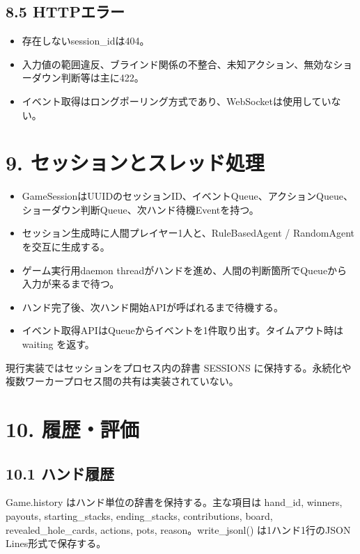 \documentclass[
]{article}
\begin{document}
\subsection{8.5 HTTPエラー}\label{httpux30a8ux30e9ux30fc}

\begin{itemize}
\item
  存在しないsession\_idは404。
\item
  入力値の範囲違反、ブラインド関係の不整合、未知アクション、無効なショーダウン判断等は主に422。
\item
  イベント取得はロングポーリング方式であり、WebSocketは使用していない。
\end{itemize}

\section{9.
セッションとスレッド処理}\label{ux30bbux30c3ux30b7ux30e7ux30f3ux3068ux30b9ux30ecux30c3ux30c9ux51e6ux7406}

\begin{itemize}
\item
  GameSessionはUUIDのセッションID、イベントQueue、アクションQueue、ショーダウン判断Queue、次ハンド待機Eventを持つ。
\item
  セッション生成時に人間プレイヤー1人と、RuleBasedAgent /
  RandomAgentを交互に生成する。
\item
  ゲーム実行用daemon
  threadがハンドを進め、人間の判断箇所でQueueから入力が来るまで待つ。
\item
  ハンド完了後、次ハンド開始APIが呼ばれるまで待機する。
\item
  イベント取得APIはQueueからイベントを1件取り出す。タイムアウト時は
  waiting を返す。
\end{itemize}

現行実装ではセッションをプロセス内の辞書 SESSIONS
に保持する。永続化や複数ワーカープロセス間の共有は実装されていない。

\section{10. 履歴・評価}\label{ux5c65ux6b74ux8a55ux4fa1}

\subsection{10.1 ハンド履歴}\label{ux30cfux30f3ux30c9ux5c65ux6b74}

Game.history はハンド単位の辞書を保持する。主な項目は hand\_id, winners,
payouts, starting\_stacks, ending\_stacks, contributions, board,
revealed\_hole\_cards, actions, pots, reason。write\_jsonl()
は1ハンド1行のJSON Lines形式で保存する。
\end{document}
